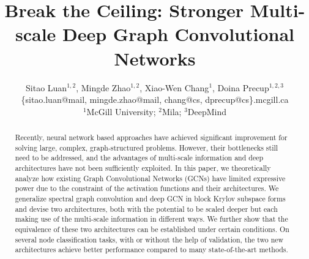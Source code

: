 \documentclass{article}
\title{Break the Ceiling: Stronger Multi-scale Deep Graph Convolutional Networks}
\author{
Sitao Luan$^{1,2}$, Mingde Zhao$^{1,2}$, Xiao-Wen Chang$^{1}$, Doina Precup$^{1,2,3}$\\
\{sitao.luan@mail, mingde.zhao@mail, chang@cs, dprecup@cs\}.mcgill.ca\\
$^1$McGill University; $^2$Mila; $^3$DeepMind
}
\begin{document}
\maketitle	

\begin{abstract}
Recently, neural network based approaches have achieved significant improvement for solving large, complex, graph-structured problems. However, their bottlenecks still need to be addressed, and the advantages of multi-scale information and deep architectures have not been sufficiently exploited. In this paper, we theoretically analyze how existing Graph Convolutional Networks (GCNs) have limited expressive power due to the constraint of the activation functions and their architectures. We generalize spectral graph convolution and deep GCN in block Krylov subspace forms and devise two architectures, both with the potential to be scaled deeper but each making use of the multi-scale information in different ways. We further show that the equivalence of these two architectures can be established under certain conditions. On several node classification tasks, with or without the help of validation, the two new architectures achieve better performance compared to many state-of-the-art methods.
\end{abstract}
	
\end{document}
